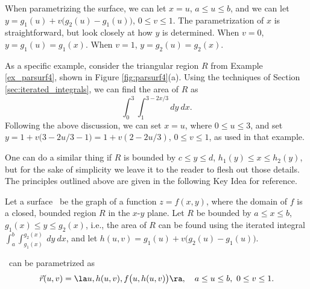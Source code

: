 When parametrizing the surface, we can let $x=u$, $a\leq u\leq b$, and we can let $y = g_1(u)+v\big(g_2(u)-g_1(u)\big)$, $0\leq v\leq 1$. The parametrization of $x$ is straightforward, but look closely at how $y$ is determined. When $v=0$, $y=g_1(u) = g_1(x)$. When $v=1$, $y= g_2(u)=g_2(x)$. 


 As a specific example, consider the triangular region $R$ from Example \ref{ex_parsurf4}, shown in Figure \ref{fig:parsurf4}(a). Using the techniques of Section \ref{sec:iterated_integrals}, we can find the area of $R$ as
\[
\int_0^3\int_1^{3-2x/3} dy\ dx.
\]
Following the above discussion, we can set $x=u$, where $0\leq u\leq 3$, and set $y = 1+ v\big(3-2u/3-1\big) = 1+v(2-2u/3)$, $0\leq v\leq 1$, as used in that example.

One can do a similar thing if $R$ is bounded by $c\leq y\leq d$, $h_1(y)\leq x\leq h_2(y)$, but for the sake of simplicity we leave it to the reader to flesh out those details. The principles outlined above are given in the following Key Idea for reference.

{Let a surface \surfaceS\ be the graph of a function $z=f(x,y)$, where the domain of $f$ is  a closed, bounded region $R$ in the $x$-$y$ plane. 
Let $R$ be bounded by $a\leq x\leq b$, $g_1(x)\leq y\leq g_2(x)$, i.e., the area of $R$ can be found using the iterated integral $\int_a^b\int_{g_1(x)}^{g_2(x)}\ dy\ dx$, and let $h(u,v) = g_1(u)+v\big(g_2(u)-g_1(u)\big)$. 

\surfaceS\ can be parametrized as 
\[
\vec r(u,v) = \la u, h(u,v), f\big(u,h(u,v)\big)\ra,\quad a\leq u\leq b,\ 0\leq v\leq 1.
\]
}\\

